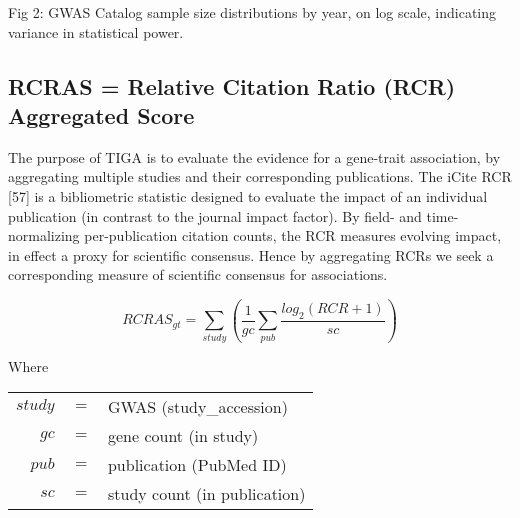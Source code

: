 Fig 2: GWAS Catalog sample size distributions by year, on log scale, indicating variance in statistical power.

\subsection{RCRAS = Relative Citation Ratio (RCR) Aggregated Score}

The purpose of TIGA is to evaluate the evidence for a gene-trait association, by aggregating multiple studies and their corresponding publications.  The iCite RCR [57] is a bibliometric statistic designed to evaluate the impact of an individual publication (in contrast to the journal impact factor).  By field- and time-normalizing per-publication citation counts, the RCR measures evolving impact, in effect a proxy for scientific consensus.  Hence by aggregating RCRs we seek a corresponding measure of scientific consensus for associations.

\begin{equation} RCRAS_{gt} = \sum_{study} \left(\frac{1}{gc} \sum_{pub} \frac{log_{2}(RCR + 1)}{sc}\right)
\end{equation}

Where \\
\begin{center}
\begin{tabular}{ r c l }
    $study$ & $=$ & GWAS (study\_accession) \\
	$gc$ & $=$ & gene count (in study)	\\
	$pub$ & $=$ & publication (PubMed ID)	\\
	$sc$ & $=$ & study count (in publication)	\\
\end{tabular}
\end{center}

